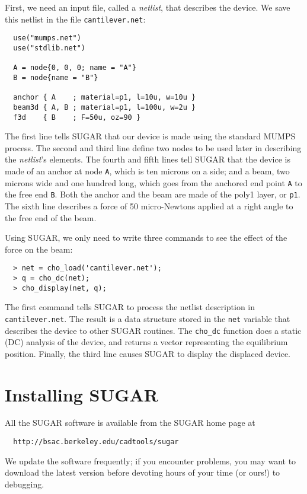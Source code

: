 First, we need an input file, called a \emph{netlist}, that describes
the device.  We save this netlist in the file \texttt{cantilever.net}:
\begin{verbatim}
  use("mumps.net")
  use("stdlib.net")

  A = node{0, 0, 0; name = "A"}
  B = node{name = "B"}
  
  anchor { A    ; material=p1, l=10u, w=10u }
  beam3d { A, B ; material=p1, l=100u, w=2u }
  f3d    { B    ; F=50u, oz=90 }
\end{verbatim}
The first line tells SUGAR that our device is made using the standard
MUMPS process.  The second and third line define two nodes to be used 
later in describing the \emph{netlist}'s elements. The fourth and fifth 
lines tell SUGAR that the device
is made of an anchor at node \texttt{A}, which is ten microns on a side;
and a beam, two microns wide and one hundred long, which goes from the 
anchored end point \texttt{A} to the free end \texttt{B}.  Both the
anchor and the beam are made of the poly1 layer, or \texttt{p1}.
The sixth line describes a force of 50 micro-Newtons applied at a
right angle to the free end of the beam.

Using SUGAR, we only need to write three commands to see the effect 
of the force on the beam:
\begin{verbatim}
  > net = cho_load('cantilever.net');
  > q = cho_dc(net);
  > cho_display(net, q);
\end{verbatim}
The first command tells SUGAR to process the netlist description in
\texttt{cantilever.net}.  The result is a data structure stored in the
\texttt{net} variable that describes the device to other SUGAR routines.
The \texttt{cho\_dc} function does a static (DC) analysis of the device,
and returns a vector representing the equilibrium position.  Finally,
the third line causes SUGAR to display the displaced device.


\section{Installing SUGAR}

All the SUGAR software is available from the SUGAR home page at
\begin{verbatim}
  http://bsac.berkeley.edu/cadtools/sugar
\end{verbatim}
We update the software frequently; if you encounter problems, you may want to
download the latest version before devoting hours of your time (or ours!) to
debugging.

